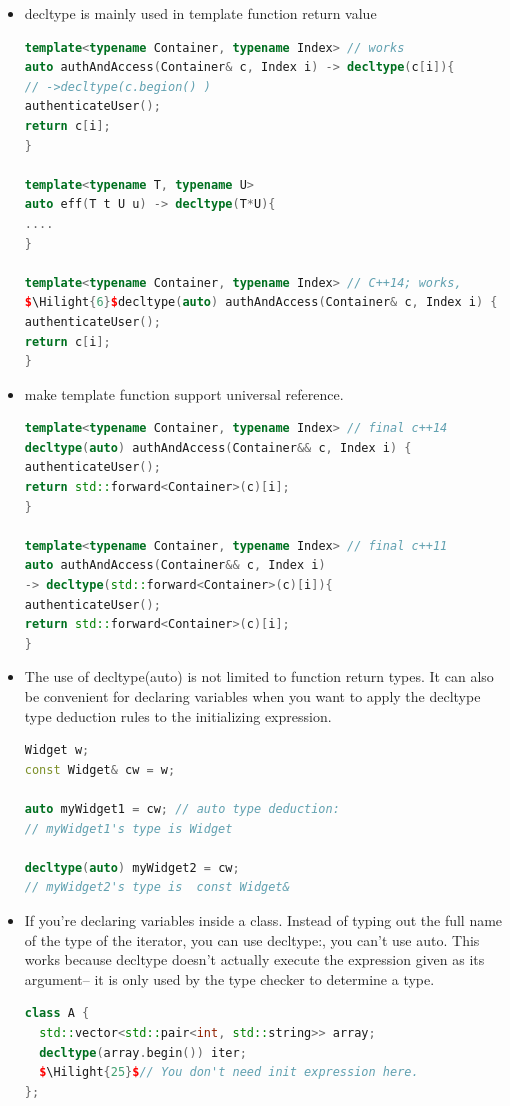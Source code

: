 \documentclass[a4paper,12pt,twoside]{book}
\newcommand{\Hilight}[1]{\makebox[0pt][l]{\color{yellow}\rule[-3pt]{#1em}{11pt}}}
\begin{document}
\begin{itemize}
\item decltype is mainly used in template function return value
\begin{lstlisting}[frame=single, language=c++, mathescape=true]
template<typename Container, typename Index> // works
auto authAndAccess(Container& c, Index i) -> decltype(c[i]){
// ->decltype(c.begion() )
authenticateUser();
return c[i];
}

template<typename T, typename U>
auto eff(T t U u) -> decltype(T*U){
....
}

template<typename Container, typename Index> // C++14; works,
$\Hilight{6}$decltype(auto) authAndAccess(Container& c, Index i) {
authenticateUser();
return c[i];
}
\end{lstlisting}


\item make template function support universal reference.
\begin{lstlisting}[frame=single, language=c++, mathescape=true]
template<typename Container, typename Index> // final c++14
decltype(auto) authAndAccess(Container&& c, Index i) {
authenticateUser();
return std::forward<Container>(c)[i];
}

template<typename Container, typename Index> // final c++11
auto authAndAccess(Container&& c, Index i)
-> decltype(std::forward<Container>(c)[i]){
authenticateUser();
return std::forward<Container>(c)[i];
}
\end{lstlisting}

\item The use of decltype(auto) is not limited to function return types. It can also be convenient for declaring variables when you want to apply the decltype type deduction rules to the initializing expression.
\begin{lstlisting}[frame=single, language=c++, mathescape=true]
Widget w;
const Widget& cw = w;

auto myWidget1 = cw; // auto type deduction:
// myWidget1's type is Widget

decltype(auto) myWidget2 = cw;
// myWidget2's type is  const Widget&
\end{lstlisting}

\item  If you're declaring variables inside a class. Instead of typing out the full name of the type of the iterator, you can use decltype:, you can't use auto.  This works because decltype doesn't actually execute the expression given as its argument-- it is only used by the type checker to determine a type.
\begin{lstlisting}[frame=single, language=c++, mathescape=true]
class A {
  std::vector<std::pair<int, std::string>> array;
  decltype(array.begin()) iter;
  $\Hilight{25}$// You don't need init expression here.
};
\end{lstlisting}



\end{itemize}
\end{document}
